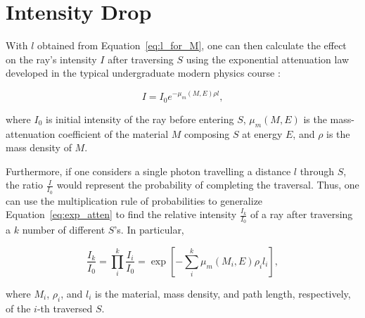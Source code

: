 \section{Intensity Drop}
With $l$ obtained from Equation~\ref{eq:l_for_M}, one can then calculate the effect on the ray's intensity $I$ after traversing $S$ using the exponential attenuation law developed in the typical undergraduate modern physics course \cite{serway}:

\begin{equation}
  I = I_0 e^{-\mu_m(M, E) \rho l},
  \label{eq:exp_atten}
\end{equation}

\noindent where $I_0$ is initial intensity of the ray before entering $S$, $\mu_m(M, E)$ is the mass-attenuation coefficient of the material $M$ composing $S$ at energy $E$, and $\rho$ is the mass density of $M$. 

\par Furthermore, if one considers a single photon travelling a distance $l$ through $S$, the ratio $\frac{I}{I_0}$ would represent the probability of completing the traversal. Thus, one can use the multiplication rule of probabilities to generalize Equation~\ref{eq:exp_atten} to find the relative intensity $\frac{I_k}{I_0}$ of a ray after traversing a $k$ number of different $S$'s. In particular,

\begin{equation}
  \frac{I_k}{I_0} = \prod_i^{k} \frac{I_i}{I_0} =  \exp\left[ -\sum_i^k \mu_m(M_i, E) \rho_i l_i \right],
  \label{eq:exp_atten_k}
\end{equation}

\noindent where $M_i$, $\rho_i$, and $l_i$ is the material, mass density, and path length, respectively, of the $i$-th traversed $S$.

